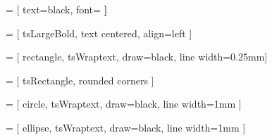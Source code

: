 
%
 = [ 
    text=black, 
    font=\bfseries\large
]

 = [ 
    tsLargeBold, 
    text centered, 
    align=left
]

 = [ 
    rectangle,
    tsWraptext,               
    draw=black,
    line width=0.25mm]

 = [  
    tsRectangle,
    rounded corners
]

 = [   
        circle,
        tsWraptext,
        draw=black,
        line width=1mm
]

 = [   
    ellipse,
    tsWraptext,
    draw=black,
    line width=1mm
]

